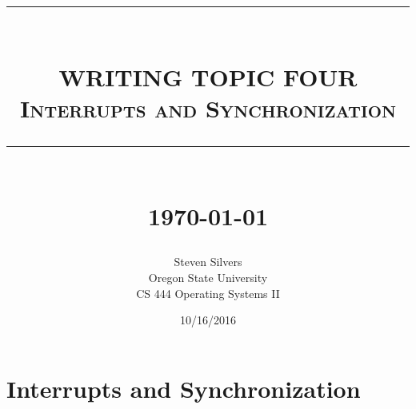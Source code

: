 \documentclass[10pt,serif,draftclsnofoot,onecolumn]{IEEEtran}
\newcommand{\HRule}[1]{\rule{\linewidth}{#1}}
\begin{document}
	\begin{titlepage}


	\title{ \normalsize \textsc{}
			\\ [2.0cm]
			\HRule{0.5pt} \\
			\LARGE \textbf{\uppercase{Writing topic four}}
			\\ \normalsize \textsc{Interrupts and Synchronization}
			\HRule{2pt} \\ [0.5cm]
			\normalsize \today \vspace*{5\baselineskip}}
	\date{10/16/2016}
	
	\author{Steven Silvers \\
			Oregon State University \\
			CS 444 Operating Systems II}
	\maketitle
	\end{titlepage}
	\newpage
	\section{Interrupts and Synchronization}
\end{document}
